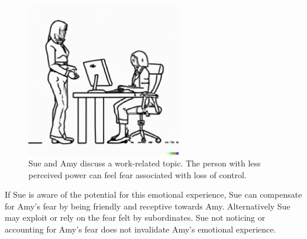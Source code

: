 \begin{figure}[H]
    \centering
\includegraphics[width=0.6\textwidth,trim={0 1cm 0 0},clip]{images/female_supervisor_standing_while_talking_to_seated_female_employee_typing_on_keyboard.pdf}
    \caption{Sue and Amy discuss a work-related topic. The person with less perceived power can feel fear associated with loss of control.}
    \label{fig:subordinate_and_supervisor}
\end{figure}



If Sue is aware of the potential for this emotional experience, Sue can compensate for Amy's fear by being friendly and receptive towards Amy. Alternatively Sue may exploit or rely on the fear felt by subordinates. Sue not noticing or accounting for Amy's fear does not invalidate Amy's emotional experience.





